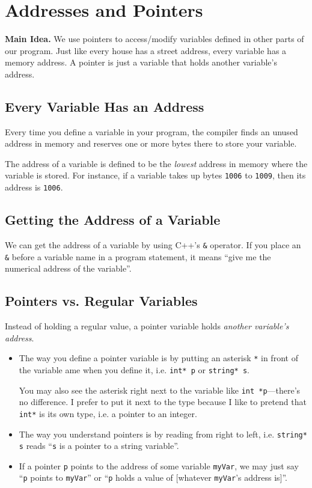 \documentclass[class=article, crop=false]{standalone}
\begin{document}
  \section{Addresses and Pointers}
  \textbf{Main Idea.} We use pointers to access/modify variables defined in other parts of our program. Just like every house has a street address, every variable has a memory address. A pointer is just a variable that holds another variable's address.
  \subsection{Every Variable Has an Address}
  Every time you define a variable in your program, the compiler finds an unused address in memory and reserves one or more bytes there to store your variable.
  \begin{note}{}
    The address of a variable is defined to be the \emph{lowest} address in memory where the variable is stored. For instance, if a variable takes up bytes \texttt{1006} to \texttt{1009}, then its address is \texttt{1006}.
  \end{note}
  \subsection{Getting the Address of a Variable}
  We can get the address of a variable by using C++'s \texttt{\&} operator. If you place an \texttt{\&} before a variable name in a program statement, it means ``give me the numerical address of the variable''. 
  \subsection{Pointers vs. Regular Variables}
  Instead of holding a regular value, a pointer variable holds \emph{another variable's address}.
  \begin{itemize}
    \item The way you define a pointer variable is by putting an asterisk \texttt{*} in front of the variable ame when you define it, i.e. \texttt{int* p} or \texttt{string* s}.
    \begin{note}{}
      You may also see the asterisk right next to the variable like \texttt{int *p}---there's no difference. I prefer to put it next to the type because I like to pretend that \texttt{int*} is its own type, i.e. a pointer to an integer.
    \end{note}
    \item The way you understand pointers is by reading from right to left, i.e. \texttt{string* s} reads ``\texttt{s} is a pointer to a string variable''.
    \item If a pointer \texttt{p} points to the address of some variable \texttt{myVar}, we may just say ``\texttt{p} points to \texttt{myVar}'' or ``\texttt{p} holds a value of [whatever \texttt{myVar}'s address is]''.
  \end{itemize}
\end{document}
